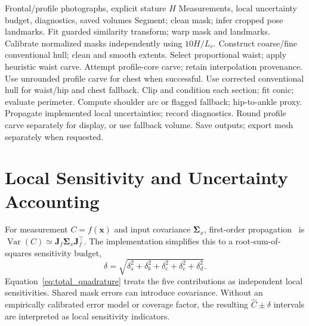 \documentclass[11pt,a4paper]{article}
\numberwithin{equation}{section}
\begin{document}
\begin{algorithm}[!t]
\caption{Implemented Two-Branch Anthropometry Pipeline}
\label{alg:implemented_pipeline}
\begin{algorithmic}[1]
\REQUIRE Frontal/profile photographs, explicit stature $H$
\ENSURE Measurements, local uncertainty budget, diagnostics, saved volumes
\STATE Segment; clean mask; infer cropped pose landmarks.
\STATE Fit guarded similarity transform; warp mask and landmarks.
\ENDFOR
\STATE Calibrate normalized masks independently using $10H/L_v$.
\STATE Construct coarse/fine conventional hull; clean and smooth extents.
\STATE Select proportional waist; apply heuristic waist carve.
\STATE Attempt profile-core carve; retain interpolation provenance.
\STATE Use unrounded profile carve for chest when successful.
\STATE Use corrected conventional hull for waist/hip and chest fallback.
\STATE Clip and condition each section; fit conic; evaluate perimeter.
\STATE Compute shoulder arc or flagged fallback; hip-to-ankle proxy.
\STATE Propagate implemented local uncertainties; record diagnostics.
\STATE Round profile carve separately for display, or use fallback volume.
\STATE Save outputs; export mesh separately when requested.
\end{algorithmic}
\end{algorithm}


\section{Local Sensitivity and Uncertainty Accounting}
\label{subsec:uncertainty_budget}
For measurement $C=f(\mathbf x)$ and input covariance $\mathbf\Sigma_x$, first-order propagation~\cite{jcgm2008} is $\operatorname{Var}(C)\simeq\mathbf J_f\mathbf\Sigma_x\mathbf J_f^\top$. The implementation simplifies this to a root-sum-of-squares sensitivity budget,
\begin{equation}
\delta=\sqrt{\delta_s^2+\delta_b^2+\delta_c^2+\delta_e^2+\delta_d^2}.
\label{eq:total_quadrature}
\end{equation}
Equation~\eqref{eq:total_quadrature} treats the five contributions as independent local sensitivities. Shared mask errors can introduce covariance. Without an empirically calibrated error model or coverage factor, the resulting $\hat C\pm\delta$ intervals are interpreted as local sensitivity indicators.
\end{document}

